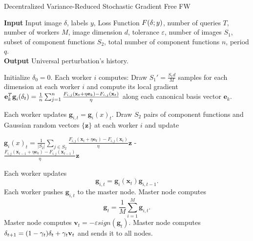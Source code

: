 \begin{algorithm}
	\caption{Decentralized Variance-Reduced Stochastic Gradient Free FW}\label{variance-reduced}
	\textbf{Input} Input image \boldmath$\delta$, labels $y$, Loss Function $F(\text{\boldmath}\delta;y)$, number of queries $T$, number of workers $M$, image dimension $d$, tolerance $\varepsilon$, number of images $S_1$, subset of component functions $S_2$, total number of component functions $n$, period $q$.\\
	\textbf{Output} Universal perturbation's history.
	\begin{algorithmic}[1]		
		\State Initialize \boldmath$\delta_0 = \text{0}$.
		\State Each worker $i$ computes:
		\State Draw {\small$S_1' = \frac{S_1d}{M}$} samples for each dimension at each worker $i$ and compute its local gradient \newline
		{\small$ \textbf{e}_k^T\textbf{g}_i(\text{\boldmath} \delta_t) = \frac{1}{n}\sum_{j=1}^{n}\frac{F_{i,j}(\textbf{x}_t + \eta\textbf{e}_k) - F_{i,j}(\textbf{x}_t) }{\eta} $} along each canonical basis vector $\textbf{e}_k$.
		
		\State Each worker updates $\textbf{g}_{i,t} = \textbf{g}_i(x)_t$.
		\Else
		\State Draw $S_2$ pairs of component functions and Gaussian random vectors $\{\textbf{z}\}$ at each worker $i$ and update
		
		\parbox[b]{\linewidth}{$\textbf{g}_i(x)_t = \frac{1}{|S_2|} \sum_{j \in S_2}\frac{F_{i,j}(\textbf{x}_t + \eta\textbf{e}_k)- F_{i,j}(\textbf{x}_t) }{\eta} \textbf{z}$ -\\
			
			$\frac{F_{i,j}(\textbf{x}_{t-1} + \eta\textbf{e}_k) - F_{i,j}(\textbf{x}_{t-1}) }{\eta} \textbf{z}$}
				
		\State Each worker updates 
		\[\textbf{g}_{i,t} = \textbf{g}_i(\textbf{x}_t) \textbf{g}_{i,t-1}.\]
		\EndIf
		\State Each worker pushes $\textbf{g}_{i,t}$ to the master node.
		\State Master node computes 
		\[\textbf{g}_t = \frac{1}{M} \sum_{i=1}^{M} \textbf{g}_{i,t}.\]
		\State Master node computes $\textbf{v}_t = - \varepsilon sign(\textbf{g}_t)$.
		\State Master node computes \boldmath$\delta_{t+1} = (1-\gamma_t)\text{\boldmath}\delta_t + \gamma_t\textbf{v}_t$ and sends it to all nodes.
		\EndFor
	\end{algorithmic}
\end{algorithm}
